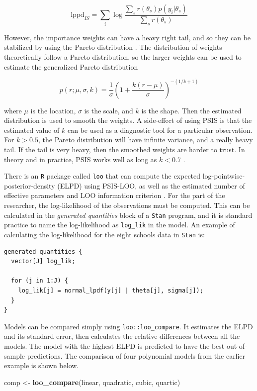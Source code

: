 \documentclass[11pt, oneside, openany]{scrbook}
\newenvironment{Shaded}{\begin{snugshade}}{\end{snugshade}}
\newcommand{\KeywordTok}[1]{\textcolor[rgb]{0.13,0.29,0.53}{\textbf{#1}}}
\newcommand{\NormalTok}[1]{#1}
\newcommand{\StringTok}[1]{\textcolor[rgb]{0.31,0.60,0.02}{#1}}
\begin{document}
\[
\mathrm{lppd}_{IS} = \sum_{i}\log \frac{\sum_{s} r(\theta_s) p(y_i \vert \theta_s)}{\sum_{s} r(\theta_s)}
\]

However, the importance weights can have a heavy right tail, and so they can be stabilized by using the Pareto distribution \citep{vehtari2015pareto}. The distribution of weights theoretically follow a Pareto distribution, so the larger weights can be used to estimate the generalized Pareto distribution

\[
p(r; \mu, \sigma, k) = \frac{1}{\sigma} \left(1 + \frac{k (r - \mu)}{\sigma}\right)^{-(1/k + 1)}
\]

where \(\mu\) is the location, \(\sigma\) is the scale, and \(k\) is the shape. Then the estimated distribution is used to smooth the weights. A side-effect of using PSIS is that the estimated value of \(k\) can be used as a diagnostic tool for a particular observation. For \(k>0.5\), the Pareto distribution will have infinite variance, and a really heavy tail. If the tail is very heavy, then the smoothed weights are harder to trust. In theory and in practice, PSIS works well as long as \(k < 0.7\) \citep{vehtari2015pareto}.

There is an \texttt{R} package called \texttt{loo} that can compute the expected log-pointwise-posterior-density (ELPD) using PSIS-LOO, as well as the estimated number of effective parameters and LOO information criterion \citep{R-loo}. For the part of the researcher, the log-likelihood of the observations must be computed. This can be calculated in the \emph{generated quantities} block of a \texttt{Stan} program, and it is standard practice to name the log-likelihood as \texttt{log\_lik} in the model. An example of calculating the log-likelihood for the eight schools data in \texttt{Stan} is:

\begin{verbatim}
generated quantities {
  vector[J] log_lik;

  for (j in 1:J) {
    log_lik[j] = normal_lpdf(y[j] | theta[j], sigma[j]);
  }
}
\end{verbatim}

Models can be compared simply using \texttt{loo::loo\_compare}. It estimates the ELPD and its standard error, then calculates the relative differences between all the models. The model with the highest ELPD is predicted to have the best out-of-sample predictions. The comparison of four polynomial models from the earlier example is shown below.

\begin{Shaded}
\begin{Highlighting}[]
\NormalTok{comp <-}\StringTok{ }\KeywordTok{loo_compare}\NormalTok{(linear, quadratic, cubic, quartic)}
\end{Highlighting}
\end{Shaded}
\end{document}

